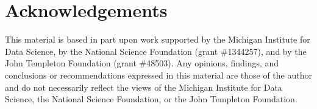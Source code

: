 \documentclass[11pt,letterpaper]{article}
\begin{document}
\section*{Acknowledgements}
This material is based in part upon work supported by the Michigan Institute for Data Science, by the National Science Foundation (grant \#1344257), and by the John Templeton Foundation (grant \#48503). Any opinions, findings, and conclusions or recommendations expressed in this material are those of the author and do not necessarily reflect the views of the Michigan Institute for Data Science, the National Science Foundation, or the John Templeton Foundation. 




\end{document}
